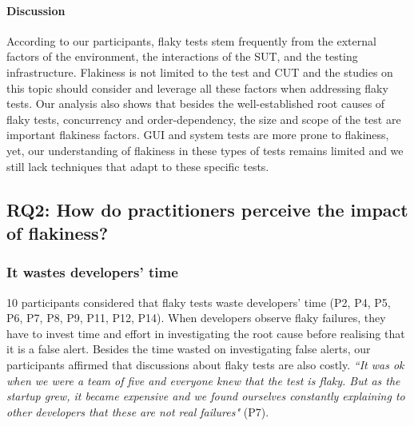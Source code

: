 \paragraph{\textbf{Discussion}}
According to our participants, flaky tests stem frequently from the external factors of the environment, the interactions of the SUT, and the testing infrastructure.
Flakiness is not limited to the test and CUT and the studies on this topic should consider and leverage all these factors when addressing flaky tests.
Our analysis also shows that besides the well-established root causes of flaky tests, \eg concurrency and order-dependency, the size and scope of the test are important flakiness factors.
GUI and system tests are more prone to flakiness, yet, our understanding of flakiness in these types of tests remains limited and we still lack techniques that adapt to these specific tests. 

\subsection{\textsc{RQ2}: How do practitioners perceive the impact of flakiness?}

\subsubsection{\textbf{It wastes developers' time}}
10 participants considered that flaky tests waste developers' time (P2, P4, P5, P6, P7, P8, P9, P11, P12, P14).
When developers observe flaky failures, they have to invest time and effort in investigating the root cause before realising that it is a false alert.
Besides the time wasted on investigating false alerts, our participants affirmed that discussions about flaky tests are also costly.
\textit{``It was ok when we were a team of five and everyone knew that the test is flaky. But as the startup grew, it became expensive and we found ourselves constantly explaining to other developers that these are not real failures"} (P7).



